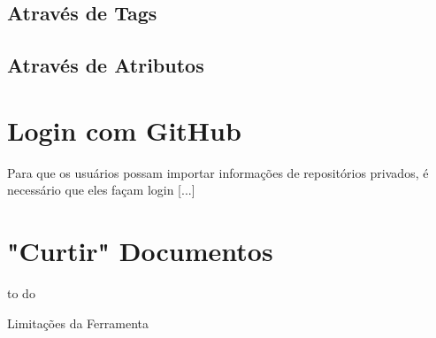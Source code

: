\subsection{Através de Tags}
\subsection{Através de Atributos}

\section{Login com GitHub}

Para que os usuários possam importar informações de repositórios privados, é necessário que eles façam login [...]

\section{"Curtir" Documentos}

to do

Limitações da Ferramenta

